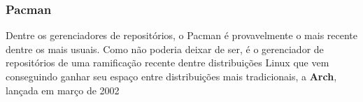 \subsubsection{Pacman} %
\label{ssub:pacman}

Dentre os gerenciadores de repositórios, o Pacman é provavelmente o mais recente dentre os mais usuais. Como não poderia deixar de ser, é  o gerenciador de repositórios de uma ramificação recente dentre distribuições Linux que vem conseguindo ganhar seu espaço entre distribuições mais tradicionais, a \textbf{Arch}, lançada em março de 2002